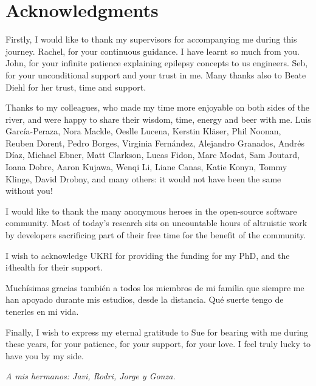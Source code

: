 \chapter{Acknowledgments}

Firstly, I would like to thank my supervisors for accompanying me during this journey.
Rachel, for your continuous guidance.
I have learnt so much from you.
John, for your infinite patience explaining epilepsy concepts to us engineers.
Seb, for your unconditional support and your trust in me.
Many thanks also to Beate Diehl for her trust, time and support.

Thanks to my colleagues, who made my time more enjoyable on both sides of the river, and were happy to share their wisdom, time, energy and beer with me.
Luis García-Peraza, Nora Mackle, Oeslle Lucena, Kerstin Kläser, Phil Noonan, Reuben Dorent, Pedro Borges, Virginia Fernández, Alejandro Granados, Andrés Díaz, Michael Ebner, Matt Clarkson, Lucas Fidon, Marc Modat, Sam Joutard, Ioana Dobre, Aaron Kujawa, Wenqi Li, Liane Canas, Katie Konyn, Tommy Klinge, David Drobny, and many others: it would not have been the same without you!

I would like to thank the many anonymous heroes in the open-source software community.
Most of today's research sits on uncountable hours of altruistic work by developers sacrificing part of their free time for the benefit of the community.

I wish to acknowledge \ac{UKRI} for providing the funding for my PhD, and the \ac{i4health} for their support.

Muchísimas gracias también a todos los miembros de mi familia que siempre me han apoyado durante mis estudios, desde la distancia.
Qué suerte tengo de tenerles en mi vida.

Finally, I wish to express my eternal gratitude to Sue for bearing with me during these years, for your patience, for your support, for your love.
I feel truly lucky to have you by my side.

\clearpage
\begin{center}
    \raggedleft
    \vspace*{\fill}
    \textit{A mis hermanos: Javi, Rodri, Jorge y Gonza.}
    \vspace*{\fill}
\end{center}
\clearpage